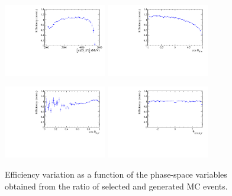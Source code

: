 \begin{figure}[h]
\includegraphics[height=!,width=0.4\textwidth]{figs/AcceptancePhsp/eff_Dspi.pdf}
\includegraphics[height=!,width=0.4\textwidth]{figs/AcceptancePhsp/eff_cosTheta_Kpi.pdf}

\includegraphics[height=!,width=0.4\textwidth]{figs/AcceptancePhsp/eff_cosTheta_Dspi.pdf}
\includegraphics[height=!,width=0.4\textwidth]{figs/AcceptancePhsp/eff_phi_Kpi_Dspi.pdf}

\caption{Efficiency variation as a function of the phase-space variables obtained from the ratio of selected and generated MC events.
}
\label{fig:PhspEff}
\end{figure}
